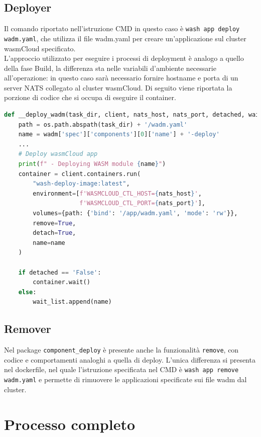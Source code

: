 \subsection{Deployer}

Il comando riportato nell'istruzione CMD in questo caso è \texttt{wash app deploy wadm.yaml}, che utilizza il file wadm.yaml per creare un'applicazione sul cluster wasmCloud specificato.\\
L'approccio utilizzato per eseguire i processi di deployment è analogo a quello della fase Build, la differenza sta nelle variabili d'ambiente necessarie all'operazione: in questo caso sarà necessario fornire hostname e porta di un server NATS collegato al cluster wasmCloud. Di seguito viene riportata la porzione di codice che si occupa di eseguire il container.\\

\begin{lstlisting}[language=python, caption={Deploy applicazione su wasmCloud}, captionpos=b, label={code:deploy}]
def __deploy_wadm(task_dir, client, nats_host, nats_port, detached, wait_list):
    path = os.path.abspath(task_dir) + '/wadm.yaml'
    name = wadm['spec']['components'][0]['name'] + '-deploy'
    ...
    # Deploy wasmCloud app
    print(f" - Deploying WASM module {name}")
    container = client.containers.run(
        "wash-deploy-image:latest",
        environment=[f'WASMCLOUD_CTL_HOST={nats_host}',
                     f'WASMCLOUD_CTL_PORT={nats_port}'],
        volumes={path: {'bind': '/app/wadm.yaml', 'mode': 'rw'}},
        remove=True,
        detach=True,
        name=name
    )
    
    if detached == 'False':
        container.wait()
    else:
        wait_list.append(name)
\end{lstlisting}

\subsection{Remover}

Nel package \texttt{component\_deploy} è presente anche la funzionalità \texttt{remove}, con codice e comportamenti analoghi a quella di deploy. L'unica differenza si presenta nel dockerfile, nel quale l'istruzione specificata nel CMD è \texttt{wash app remove wadm.yaml} e permette di rimuovere le applicazioni specificate sui file wadm dal cluster.\\

\section{Processo completo}


